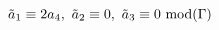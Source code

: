\begin{equation}
\tilde a_1\equiv 2 a_4, \ \tilde a_2\equiv  0, \ \tilde a_3\equiv 0\ 
\hbox{mod}  
(\Gamma)
\end{equation}

